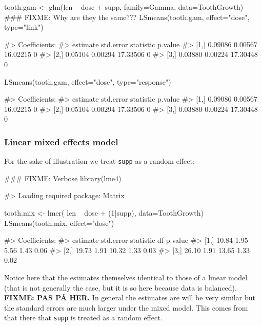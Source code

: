 \begin{Schunk}
\begin{Sinput}
tooth.gam <- glm(len ~ dose + supp, family=Gamma, data=ToothGrowth)
### FIXME: Why are they the same???
LSmeans(tooth.gam, effect="dose", type="link")
\end{Sinput}
\begin{Soutput}
#> Coefficients:
#>      estimate std.error statistic p.value
#> [1,]  0.09086   0.00567  16.02215       0
#> [2,]  0.05104   0.00294  17.33506       0
#> [3,]  0.03880   0.00224  17.30448       0
\end{Soutput}
\begin{Sinput}
LSmeans(tooth.gam, effect="dose", type="response")
\end{Sinput}
\begin{Soutput}
#> Coefficients:
#>      estimate std.error statistic p.value
#> [1,]  0.09086   0.00567  16.02215       0
#> [2,]  0.05104   0.00294  17.33506       0
#> [3,]  0.03880   0.00224  17.30448       0
\end{Soutput}
\end{Schunk}

\hypertarget{linear-mixed-effects-model}{%
\subsubsection{Linear mixed effects
model}\label{linear-mixed-effects-model}}

For the sake of illustration we treat \verb|supp| as a random effect:

\begin{Schunk}
\begin{Sinput}
### FIXME: Verbose
library(lme4)
\end{Sinput}
\begin{Soutput}
#> Loading required package: Matrix
\end{Soutput}
\begin{Sinput}
tooth.mix <- lmer( len ~ dose  + (1|supp), data=ToothGrowth)
LSmeans(tooth.mix, effect="dose")
\end{Sinput}
\begin{Soutput}
#> Coefficients:
#>      estimate std.error statistic    df p.value
#> [1,]    10.84      1.95      5.56  1.43    0.06
#> [2,]    19.73      1.91     10.32  1.33    0.03
#> [3,]    26.10      1.91     13.65  1.33    0.02
\end{Soutput}
\end{Schunk}

Notice here that the estimates themselves identical to those of a linear
model (that is not generally the case, but it is so here because data is
balanced). \textbf{FIXME: PAS PÅ HER.} In general the estimates are will
be very similar but the standard errors are much larger under the mixed
model. This comes from that there that \texttt{supp} is treated as a
random effect.

